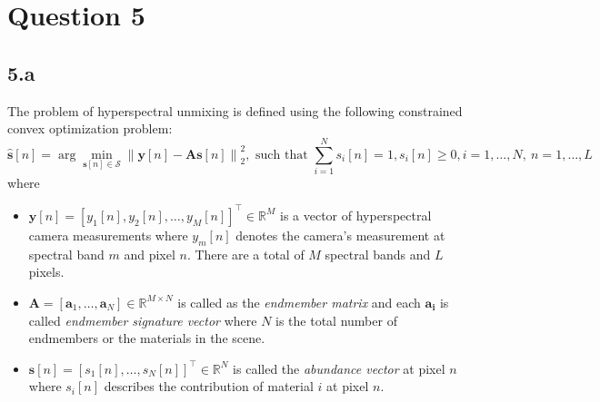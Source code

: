 \documentclass[12pt]{article}
\newcommand{\norm}[1]{\left\lVert #1 \right\rVert}
\begin{document}
\section*{Question 5}
\subsection*{5.a}
The problem of hyperspectral unmixing is defined using the following constrained convex optimization problem:
$$\hat{\boldsymbol{s}}[n] = \arg \min \limits_{\boldsymbol{s}[n] \in \mathcal{S}} \norm{\boldsymbol{y}[n] - \boldsymbol{A} \boldsymbol{s}[n]}_2^2, \text{ such that } \sum \limits_{i=1}^N s_i[n] = 1, s_i[n] \geq 0, i=1, \ldots, N,\: n=1, \ldots ,L$$
where 
\begin{itemize}
	\item $\boldsymbol{y}[n] = [y_1[n], y_2[n], \ldots, y_M[n]]^\intercal \in \mathbb{R}^M$ is a vector of hyperspectral camera measurements where $y_m[n]$ denotes the camera's measurement at spectral band $m$ and pixel $n$. There are a total of $M$ spectral bands and $L$ pixels.
	\item $\boldsymbol{A} = [\boldsymbol{a}_1, \ldots, \boldsymbol{a}_N] \in \mathbb{R}^{M \times N}$ is called as the \textit{endmember matrix} and each $\boldsymbol{a_i}$ is called \textit{endmember signature vector} where $N$ is the total number of endmembers or the materials in the scene.
	\item $\boldsymbol{s}[n] = [s_1[n], \ldots,s_N[n]]^\intercal \in \mathbb{R}^N$ is called the \textit{abundance vector} at pixel $n$ where $s_i[n]$ describes the contribution of material $i$ at pixel $n$.
\end{itemize}
\end{document}

